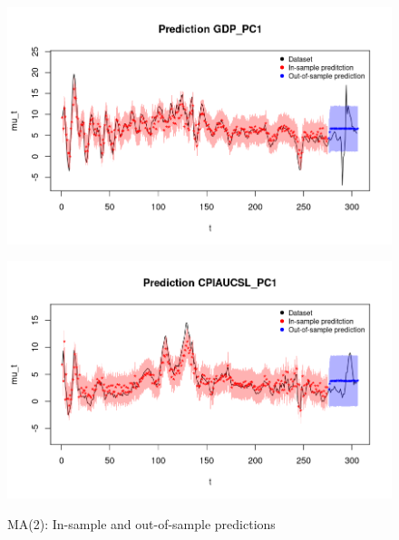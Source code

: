 \begin{figure}[h]
    \centering
    \begin{minipage}[t]{0.7\textwidth}
        \centering
        \includegraphics[width=\textwidth]{../Images/3-MA/gdp_prediction2.png}
        \label{fig:MA2_first}
    \end{minipage}
    \begin{minipage}[t]{0.7\textwidth}
        \centering
        \includegraphics[width=\textwidth]{../Images/3-MA/infl_prediction2.png}
        \label{fig:MA2_second}
    \end{minipage}
    \caption{MA(2): In-sample and out-of-sample predictions}
    \label{fig:MA2_combined}
\end{figure}